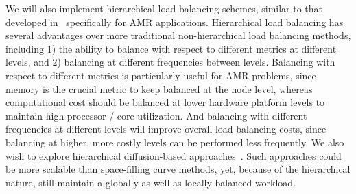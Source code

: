 \documentclass[11pt,letterpaper]{article}
\begin{document}
%
We will also implement hierarchical load balancing schemes, similar to
that developed in~\cite{LaTa06} specifically for AMR applications.
Hierarchical load balancing has several advantages over more
traditional non-hierarchical load balancing methods, including 1) the
ability to balance with respect to different metrics at different
levels, and 2) balancing at different frequencies between levels.
Balancing with respect to different metrics is particularly useful for
AMR problems, since memory is the crucial metric to keep balanced at
the node level, whereas computational cost should be balanced at lower
hardware platform levels to maintain high processor / core
utilization.  And balancing with different frequencies at different
levels will improve overall load balancing costs, since balancing at
higher, more costly levels can be performed less frequently.  We also
wish to explore hierarchical diffusion-based approaches~\cite{ScKa97}.
Such approaches could be more scalable than space-filling curve
methods, yet, because of the hierarchical nature, still maintain a
globally as well as locally balanced workload.

% 

\end{document}
